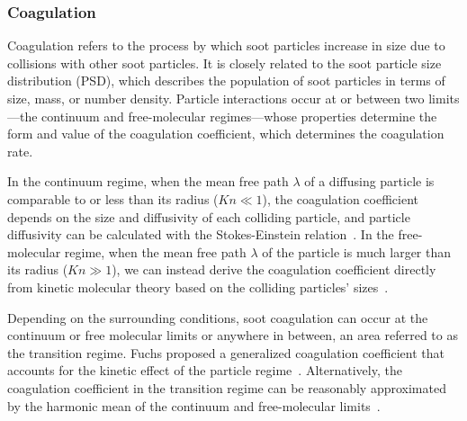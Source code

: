 \documentclass[preprint,letterpaper]{elsarticle}
\begin{document}
\subsubsection{Coagulation}
\label{s:coa}

Coagulation refers to the process by which soot particles increase in size due to collisions with other soot particles. It is closely related to the soot particle size distribution (PSD), which describes the population of soot particles in terms of size, mass, or number density.
Particle interactions occur at or between two limits---the continuum and free-molecular regimes---whose properties determine the form and value of the coagulation coefficient, which determines the coagulation rate.

In the continuum regime, when the mean free path $\lambda$ of a diffusing particle is comparable to or less than its radius ($Kn\ll1$), the coagulation coefficient depends on the size and diffusivity of each colliding particle, and particle diffusivity can be calculated with the Stokes-Einstein relation~\cite{Seinfeld_2016}.
In the free-molecular regime, when the mean free path $\lambda$ of the particle is much larger than its radius ($Kn\gg1$), we can instead derive the coagulation coefficient directly from kinetic molecular theory based on the colliding particles' sizes~\cite{Seinfeld_2016}.

Depending on the surrounding conditions, soot coagulation can occur at the continuum or free molecular limits or anywhere in between, an area referred to as the transition regime. Fuchs proposed a generalized coagulation coefficient that accounts for the kinetic effect of the particle regime~\cite{Fuchs_1964, Seinfeld_2016}. Alternatively, the coagulation coefficient in the transition regime can be reasonably approximated by the harmonic mean of the continuum and free-molecular limits~\cite{Kazakov_1998,Frenklach_2002b}.

\end{document}
